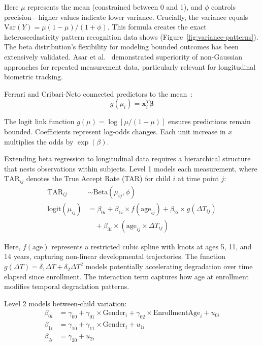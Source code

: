 \documentclass[10pt,journal,compsoc]{IEEEtran}
\begin{document}
Here $\mu$ represents the mean (constrained between 0 and 1), and $\phi$ controls precision---higher values indicate lower variance. Crucially, the variance equals $\text{Var}(Y) = \mu(1-\mu)/(1+\phi)$. This formula creates the exact heteroscedasticity pattern recognition data shows (Figure~\ref{fig:variance-patterns}). The beta distribution's flexibility for modeling bounded outcomes has been extensively validated. Asar et al.~\cite{asar2020} demonstrated superiority of non-Gaussian approaches for repeated measurement data, particularly relevant for longitudinal biometric tracking.

Ferrari and Cribari-Neto connected predictors to the mean~\cite{ferrari2004}:
\begin{equation}
g(\mu_i) = \mathbf{x}_i^T \boldsymbol{\beta}
\label{eq:link_function}
\end{equation}

The logit link function $g(\mu) = \log[\mu/(1-\mu)]$ ensures predictions remain bounded. Coefficients represent log-odds changes. Each unit increase in $x$ multiplies the odds by $\exp(\beta)$.

Extending beta regression to longitudinal data requires a hierarchical structure that nests observations within subjects. Level 1 models each measurement, where $\text{TAR}_{ij}$ denotes the True Accept Rate (TAR) for child $i$ at time point $j$:
\begin{align}
\text{TAR}_{ij} &\sim \text{Beta}(\mu_{ij}, \phi) \label{eq:level1_dist}\\
\text{logit}(\mu_{ij}) &= \beta_{0i} + \beta_{1i} \times f(\text{age}_{ij}) + \beta_{2i} \times g(\Delta T_{ij}) \nonumber \\
&\quad + \beta_{3i} \times (\text{age}_{ij} \times \Delta T_{ij}) \label{eq:level1_mean}
\end{align}

Here, $f(\text{age})$ represents a restricted cubic spline with knots at ages 5, 11, and 14 years, capturing non-linear developmental trajectories. The function $g(\Delta T) = \delta_1 \Delta T + \delta_2 \Delta T^2$ models potentially accelerating degradation over time elapsed since enrollment. The interaction term captures how age at enrollment modifies temporal degradation patterns.

Level 2 models between-child variation:
\begin{align}
\beta_{0i} &= \gamma_{00} + \gamma_{01} \times \text{Gender}_i + \gamma_{02} \times \text{EnrollmentAge}_i + u_{0i} \label{eq:level2_intercept}\\
\beta_{1i} &= \gamma_{10} + \gamma_{11} \times \text{Gender}_i + u_{1i} \label{eq:level2_age}\\
\beta_{2i} &= \gamma_{20} + u_{2i} \label{eq:level2_time}
\end{align}
\end{document}
